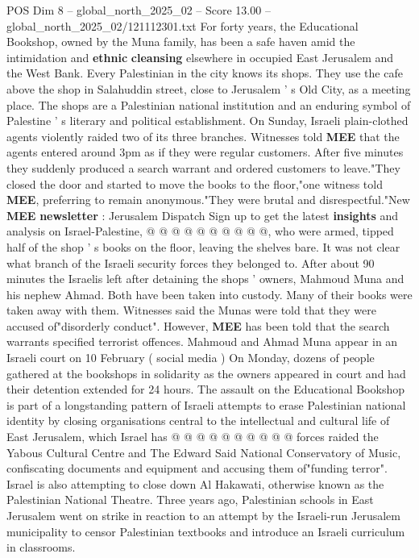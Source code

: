 \begin{textsample}{POS Dim 8 – global\_north\_2025\_02 – Score 13.00 – global\_north\_2025\_02/121112301.txt}  \label{ex:f8_pos_016}
For forty years, the Educational Bookshop, owned by the Muna family, has been a safe haven amid the intimidation and \textbf{ethnic} \textbf{cleansing} elsewhere in occupied East Jerusalem and the West Bank.
Every Palestinian in the city knows its shops.
They use the cafe above the shop in Salahuddin street, close to Jerusalem ' s Old City, as a meeting place.
The shops are a Palestinian national institution and an enduring symbol of Palestine ' s literary and political establishment.
On Sunday, Israeli plain-clothed agents violently raided two of its three branches.
Witnesses told \textbf{MEE} that the agents entered around 3pm as if they were regular customers.
After five minutes they suddenly produced a search warrant and ordered customers to leave."They closed the door and started to move the books to the floor,"one witness told \textbf{MEE}, preferring to remain anonymous."They were brutal and disrespectful."New \textbf{MEE} \textbf{newsletter} : Jerusalem Dispatch Sign up to get the latest \textbf{insights} and analysis on Israel-Palestine, @ @ @ @ @ @ @ @ @ @, who were armed, tipped half of the shop ' s books on the floor, leaving the shelves bare.
It was not clear what branch of the Israeli security forces they belonged to.
After about 90 minutes the Israelis left after detaining the shops ' owners, Mahmoud Muna and his nephew Ahmad.
Both have been taken into custody.
Many of their books were taken away with them.
Witnesses said the Munas were told that they were accused of"disorderly conduct".
However, \textbf{MEE} has been told that the search warrants specified terrorist offences.
Mahmoud and Ahmad Muna appear in an Israeli court on 10 February ( social media ) On Monday, dozens of people gathered at the bookshops in solidarity as the owners appeared in court and had their detention extended for 24 hours.
The assault on the Educational Bookshop is part of a longstanding pattern of Israeli attempts to erase Palestinian national identity by closing organisations central to the intellectual and cultural life of East Jerusalem, which Israel has @ @ @ @ @ @ @ @ @ @ forces raided the Yabous Cultural Centre and The Edward Said National Conservatory of Music, confiscating documents and equipment and accusing them of"funding terror".
Israel is also attempting to close down Al Hakawati, otherwise known as the Palestinian National Theatre.
Three years ago, Palestinian schools in East Jerusalem went on strike in reaction to an attempt by the Israeli-run Jerusalem municipality to censor Palestinian textbooks and introduce an Israeli curriculum in classrooms.

\end{textsample}

